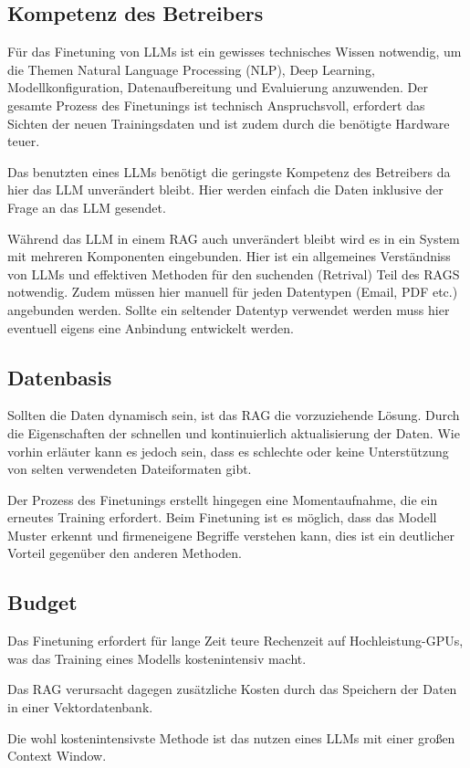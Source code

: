 \subsection{Kompetenz des Betreibers}
Für das Finetuning von LLMs ist ein gewisses technisches Wissen notwendig, um die Themen Natural Language Processing (NLP), Deep Learning, Modellkonfiguration, Datenaufbereitung und Evaluierung anzuwenden.
Der gesamte Prozess des Finetunings ist technisch Anspruchsvoll, erfordert das Sichten der neuen Trainingsdaten und ist zudem durch die benötigte Hardware teuer.

Das benutzten eines LLMs benötigt die geringste Kompetenz des Betreibers da hier das LLM unverändert bleibt. Hier werden einfach die Daten inklusive der Frage an das LLM gesendet.

Während das LLM in einem RAG auch unverändert bleibt wird es in ein System mit mehreren Komponenten eingebunden.
Hier ist ein allgemeines Verständniss von LLMs und effektiven Methoden für den suchenden (Retrival) Teil des RAGS notwendig.
Zudem müssen hier manuell für jeden Datentypen (Email, PDF etc.) angebunden werden. Sollte ein seltender Datentyp verwendet werden muss hier eventuell eigens eine Anbindung entwickelt werden. 
\subsection{Datenbasis}
Sollten die Daten dynamisch sein, ist das RAG die vorzuziehende Lösung. Durch die Eigenschaften der schnellen und kontinuierlich aktualisierung der Daten.
Wie vorhin erläuter kann es jedoch sein, dass es schlechte oder keine Unterstützung von selten verwendeten Dateiformaten gibt.

Der Prozess des Finetunings erstellt hingegen eine Momentaufnahme, die ein erneutes Training erfordert.
Beim Finetuning ist es möglich, dass das Modell Muster erkennt und firmeneigene Begriffe verstehen kann, dies ist ein deutlicher Vorteil gegenüber den anderen Methoden.


\subsection{Budget}
Das Finetuning erfordert für lange Zeit teure Rechenzeit auf Hochleistung-GPUs, was das Training eines Modells kostenintensiv macht.

Das RAG verursacht dagegen zusätzliche Kosten durch das Speichern der Daten in einer Vektordatenbank.

Die wohl kostenintensivste Methode ist das nutzen eines LLMs mit einer großen Context Window.


